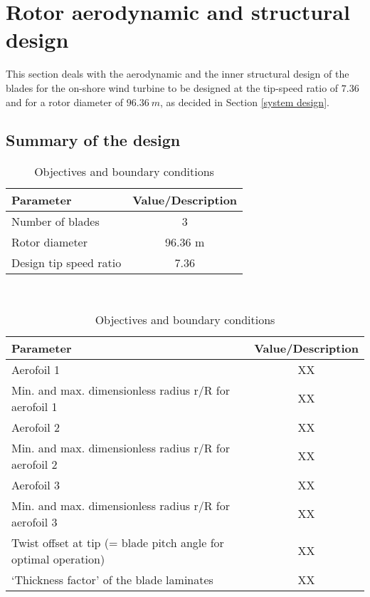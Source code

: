 \section{Rotor aerodynamic and structural design} \label{rotor design}
This section deals with the aerodynamic and the inner structural design of the blades for the on-shore wind turbine to be designed at the tip-speed ratio of $7.36$ and for a rotor diameter of $96.36\ m$, as decided in Section \ref{system design}. 
\subsection{Summary of the design}
\begin{table}[H]
\begin{center} 
\caption{Objectives and boundary conditions}\label{tab:rotordesign2}
\begin{tabular}{ |l|c| } 
\hline
\textbf{Parameter} & \textbf{Value/Description}  \\ 
\hline
Number of blades & 3  \\ 
\hline
Rotor diameter & 96.36 m \\ 
\hline
Design tip speed ratio & 7.36 \\
\hline
\end{tabular} \\
\end{center}
\end{table}

\begin{table}[H]
\begin{center} 
\caption{Objectives and boundary conditions}\label{tab:rotordesign2}
\begin{tabular}{ |l|c| } 
\hline
\textbf{Parameter} & \textbf{Value/Description}  \\ 
\hline
Aerofoil 1 & XX  \\ 
\hline
Min. and max. dimensionless radius r/R for aerofoil 1 & XX \\ 
\hline
Aerofoil 2 & XX \\
\hline
Min. and max. dimensionless radius r/R for aerofoil 2 & XX \\
\hline
Aerofoil 3 & XX \\
\hline
Min. and max. dimensionless radius r/R for aerofoil 3 & XX \\
\hline
Twist offset at tip (= blade pitch angle for optimal operation) & XX \\
\hline
‘Thickness factor’ of the blade laminates & XX \\
\hline
\end{tabular} \\
\end{center}
\end{table}


